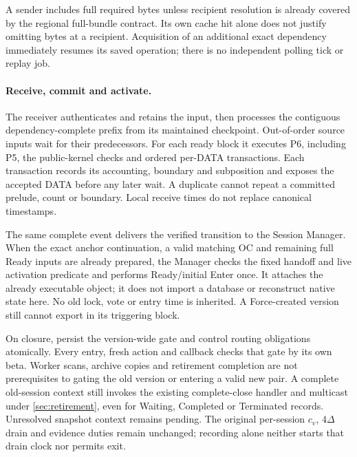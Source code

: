 A sender includes full required bytes unless recipient resolution is
already covered by the regional full-bundle contract. Its own cache hit
alone does not justify omitting bytes at a recipient. Acquisition of an
additional exact dependency immediately resumes its saved operation;
there is no independent polling tick or replay job.

\paragraph{Receive, commit and activate.}
The receiver authenticates and retains the input, then processes the
contiguous dependency-complete prefix from its maintained checkpoint.
Out-of-order source inputs wait for their predecessors. For each ready
block it executes P6, including P5, the public-kernel checks and ordered
per-DATA transactions. Each transaction records its accounting,
boundary and subposition and exposes the accepted DATA before any
later wait. A duplicate cannot repeat a committed prelude, count or
boundary. Local receive times do not replace canonical timestamps.

The same complete event delivers the verified transition to the Session
Manager. When the exact anchor continuation, a valid matching OC and
remaining full Ready inputs are already prepared, the Manager checks the fixed handoff and
live activation predicate and performs Ready/initial Enter once. It
attaches the already executable object; it does not import a database
or reconstruct native state here. No old lock, vote or entry time is
inherited. A Force-created version still cannot export in its triggering
block.

On closure, persist the version-wide  gate and control
routing obligations atomically. Every entry, fresh action and callback
checks that gate by its own beta. Worker scans, archive copies and
retirement completion are not prerequisites to gating the old version
or entering a valid new pair. A complete old-session context still
invokes the existing complete-close handler and multicast under
\cref{sec:retirement}, even for Waiting, Completed or Terminated records.
Unresolved snapshot context remains pending. The original per-session
$c_v$, $4\Delta$ drain and evidence duties remain unchanged; recording
 alone neither starts that drain clock nor permits exit.

